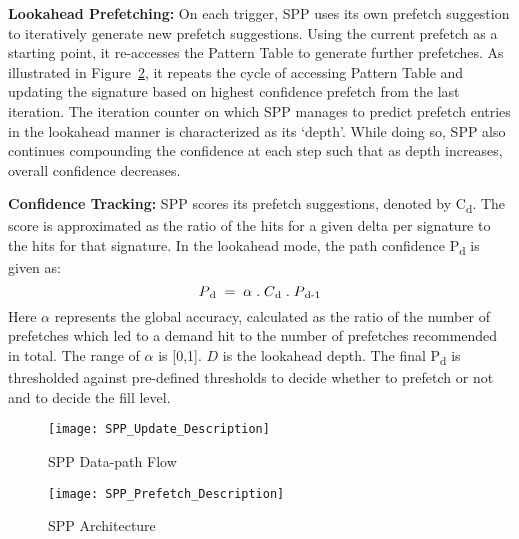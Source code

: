 \noindent \textbf{Lookahead Prefetching:} On each trigger, SPP uses
its own prefetch suggestion to iteratively generate new prefetch
suggestions.  Using the current prefetch as a starting point, it
re-accesses the Pattern Table to generate further prefetches. As
illustrated in Figure~\ref{fig:spp_structure}, it repeats the cycle of
accessing Pattern Table and updating the signature based on highest
confidence prefetch from the last iteration. The iteration counter on
which SPP manages to predict prefetch entries in the lookahead manner
is characterized as its `depth'. While doing so, SPP also continues
compounding the confidence at each step such that as depth increases,
overall confidence decreases.

\noindent \textbf{Confidence Tracking:} SPP scores its prefetch
suggestions, denoted by C\textsubscript{d}.  The score is approximated
as the ratio of the hits for a given delta per signature to the hits
for that signature. In the lookahead mode, the path confidence
P\textsubscript{d} is given as:
$$P\textsubscript{d} \;=\; \alpha \;.\; C\textsubscript{d} \;.\;
P\textsubscript{d-1}$$ Here $\alpha$ represents the global accuracy,
calculated as the ratio of the number of prefetches which led to a
demand hit to the number of prefetches recommended in total. The range
of $\alpha$ is [0,1].  $D$ is the lookahead depth. The final
P\textsubscript{d} is thresholded against pre-defined thresholds to
decide whether to prefetch or not and to decide the fill level.

\begin{figure}
  \begin{center}
  \texttt{[image: SPP\_Update\_Description]}
  \caption{SPP Data-path Flow}
  \label{fig:spp_update}
  \end{center}
\end{figure}


\begin{figure}
  \begin{center}
  \texttt{[image: SPP\_Prefetch\_Description]}
  \caption{SPP Architecture}
  \label{fig:spp_structure}
  \end{center}
\end{figure}

